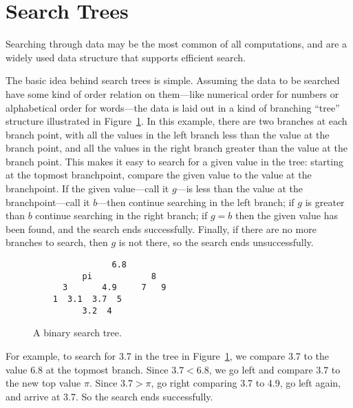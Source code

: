 \newcommand{\bintree}{\text{BT}}
\newcommand{\rectree}{\text{RT}}
\newcommand{\ubt}{\text{UT}}
\newcommand{\Searcht}{\text{ST}}
\newcommand{\leafset}{\text{Leaves}}
\newcommand{\leafp}[1]{\text{leaf?}(#1)}
\newcommand{\rightsub}[1]{\text{right}(#1)}
\newcommand{\leftsub}[1]{\text{left}(#1)}
\newcommand{\subtrees}[1]{\text{sbtrs}(#1)}

\section{Search Trees}

Searching through data may be the most common of all computations, and
 are a widely used data structure that supports
efficient search.

The basic idea behind search trees is simple.  Assuming the data to be
searched have some kind of order relation on them---like numerical order
for numbers or alphabetical order for words---the data is laid out in
a kind of branching ``tree'' structure illustrated in
Figure~\ref{searchtree1}.  In this example, there are two branches at
each branch point, with all the values in the left branch less than
the value at the branch point, and all the values in the right branch
greater than the value at the branch point.  This makes it easy to
search for a given value in the tree: starting at the topmost
branchpoint, compare the given value to the value at the branchpoint.
If the given value---call it $g$---is less than the value at the
branchpoint---call it $b$---then continue searching in the left
branch; if $g$ is greater than $b$ continue searching in the right
branch; if $g = b$ then the given value has been found, and the search
ends successfully.  Finally, if there are no more branches to search,
then $g$ is not there, so the search ends unsuccessfully.

\begin{figure}


\begin{verbatim}
                6.8
          pi            8  
      3       4.9     7   9 
    1  3.1  3.7  5
          3.2  4 
\end{verbatim}

\caption{A binary search tree.}

\label{searchtree1}

\end{figure}

For example, to search for 3.7 in the tree in Figure~\ref{searchtree1},
we compare 3.7 to the value 6.8 at the topmost branch.  Since $3.7 <
6.8$, we go left and compare $3.7$ to the new top value $\pi$.  Since
$3.7 > \pi$, go right comparing 3.7 to 4.9, go left again, and arrive
at 3.7. So the search ends successfully.

